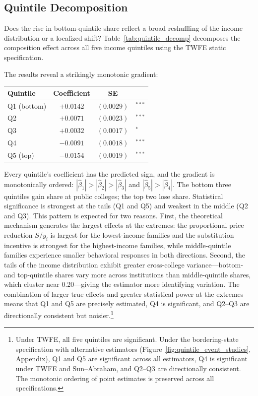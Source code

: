 \subsection{Quintile Decomposition}
\label{sec:results_quintile}

Does the rise in bottom-quintile share reflect a broad reshuffling of
the income distribution or a localized shift?
Table~\ref{tab:quintile_decomp} decomposes the composition effect
across all five income quintiles using the TWFE static specification.

The results reveal a strikingly monotonic gradient:

\begin{center}
\begin{tabular}{lccl}
\toprule
Quintile & Coefficient & SE & \\
\midrule
Q1 (bottom) & $+0.0142$ & $(0.0029)$ & $^{***}$ \\
Q2 & $+0.0071$ & $(0.0023)$ & $^{***}$ \\
Q3 & $+0.0032$ & $(0.0017)$ & $^{*}$ \\
Q4 & $-0.0091$ & $(0.0018)$ & $^{***}$ \\
Q5 (top) & $-0.0154$ & $(0.0019)$ & $^{***}$ \\
\bottomrule
\end{tabular}
\end{center}

Every quintile's coefficient has the predicted sign, and the gradient
is monotonically ordered: $|\hat\beta_1| > |\hat\beta_2| >
|\hat\beta_3|$ and $|\hat\beta_5| > |\hat\beta_4|$. The bottom three
quintiles gain share at public colleges; the top two lose share.
Statistical significance is strongest at the tails (Q1 and Q5) and
weakest in the middle (Q2 and Q3). This pattern is expected for two
reasons. First, the theoretical mechanism generates the largest effects
at the extremes: the proportional price reduction $S/y_i$ is largest
for the lowest-income families and the substitution incentive is
strongest for the highest-income families, while middle-quintile
families experience smaller behavioral responses in both directions.
Second, the tails of the income distribution exhibit greater
cross-college variance---bottom- and top-quintile shares vary more
across institutions than middle-quintile shares, which cluster near
0.20---giving the estimator more identifying variation. The combination
of larger true effects and greater statistical power at the extremes
means that Q1 and Q5 are precisely estimated, Q4 is significant, and
Q2--Q3 are directionally consistent but noisier.\footnote{Under TWFE,
all five quintiles are significant. Under the bordering-state
specification with alternative estimators
(Figure~\ref{fig:quintile_event_studies}, Appendix), Q1 and Q5 are
significant across all estimators, Q4 is significant under TWFE and
Sun--Abraham, and Q2--Q3 are directionally consistent. The monotonic
ordering of point estimates is preserved across all specifications.}

